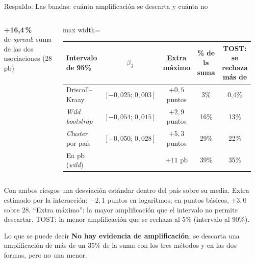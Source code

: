 \documentclass[aspectratio=169]{beamer}
\newcommand{\cifra}[2]{\begin{center}{\Huge\bfseries\color{tesisblue}#1}\\[2pt]{\small #2}\end{center}}
\begin{document}
\begin{frame}{Respaldo: Las bandas: cuánta amplificación se descarta y cuánta no}
\begin{columns}[c]
\cifra{+16,4\,\%}{de \textit{spread}: suma de las dos asociaciones (28 pb)}
\centering
\small
\begin{adjustbox}{max width=\textwidth}
\begin{tabular}{l cccc}
\toprule
Intervalo de 95\% & $\beta_3$ & Extra máximo & \% de la suma & TOST: se rechaza más de \\
\midrule
Driscoll--Kraay & $[-0{,}025;\,0{,}003]$ & $+0{,}5$ puntos & 3\% & 0,4\% \\
\textit{Wild bootstrap} & $[-0{,}054;\,0{,}015]$ & $+2{,}9$ puntos & 16\% & 13\% \\
\textit{Cluster} por país & $[-0{,}050;\,0{,}028]$ & $+5{,}3$ puntos & 29\% & 22\% \\
En pb (\textit{wild}) & & $+11$ pb & 39\% & 35\% \\
\bottomrule
\end{tabular}
\end{adjustbox}
\end{columns}
\vspace{2pt}
{\footnotesize\raggedright Con ambos riesgos una desviación estándar dentro del país sobre su media. Extra estimado por la interacción: $-2{,}1$ puntos en logaritmos; en puntos básicos, $+3{,}0$ sobre 28. ``Extra máximo'': la mayor amplificación que el intervalo no permite descartar. TOST: la menor amplificación que se rechaza al 5\% (intervalo al 90\%).\par}
\vspace{-2pt}
\begin{alertblock}{Lo que se puede decir}
\footnotesize \textbf{No hay evidencia de amplificación}; se descarta una amplificación de más de un 35\% de la suma con los tres métodos y en las dos formas, pero no una menor.
\end{alertblock}
\end{frame}
\end{document}
